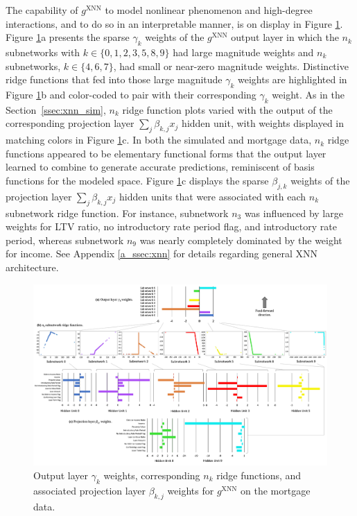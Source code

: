 \documentclass[information,article,accept,moreauthors,pdftex]{Definitions/mdpi}
\begin{document}
{{{The capability of $g^\text{XNN}$ to model nonlinear phenomenon and high-degree interactions, and to do so in an interpretable manner, is on display in Figure \ref{fig:mort_xnn_glob_ridge}. Figure \ref{fig:mort_xnn_glob_ridge}{a} presents the sparse $\gamma_k$ weights of the $g^\text{XNN}$ output layer in which the $n_k$ subnetworks with $k \in \{0,1,2,3,5,8,9\}$ had large magnitude weights and $n_k$ subnetworks, $k \in \{4,6,7\}$, had small or near-zero magnitude weights. Distinctive ridge functions that fed into those large magnitude $\gamma_k$ weights are highlighted in Figure \ref{fig:mort_xnn_glob_ridge}{b} and color-coded to pair with their corresponding $\gamma_k$ weight. As in the Section~\ref{ssec:xnn_sim}, $n_k$ ridge function plots varied with the output of the corresponding projection layer $\sum_j\beta_{k,j}x_j$ hidden unit, with weights displayed in matching colors in Figure \ref{fig:mort_xnn_glob_ridge}{c}. In both the simulated and mortgage data, $n_k$ ridge functions appeared to be elementary functional forms that the output layer learned to combine to generate accurate predictions, reminiscent of basis functions for the modeled space. Figure \ref{fig:mort_xnn_glob_ridge}{c} displays the sparse $\beta_{j,k}$ weights of the projection layer $\sum_j\beta_{k,j}x_j$ hidden units that were associated with each $n_k$ subnetwork ridge function. For instance, subnetwork $n_3$ was influenced by large weights for LTV ratio, no introductory rate period flag, and introductory rate period, whereas subnetwork $n_9$ was nearly completely dominated by the weight for income. See Appendix \ref{a_ssec:xnn} for details regarding general XNN architecture.

\begin{figure}[H]
\includegraphics[width=17cm]{img/mort_xnn_glob_ridge.png}
\caption{Output layer $\gamma_k$ weights, corresponding $n_k$ ridge functions, and associated projection layer $\beta_{k,j}$ weights for $g^\text{XNN}$ on the mortgage data.}
\label{fig:mort_xnn_glob_ridge}
\end{figure} 

}}}
\end{document}
